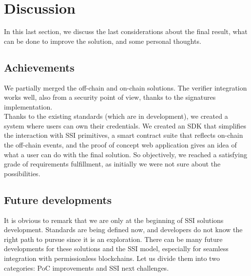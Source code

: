 \section{Discussion}
In this last section, we discuss the last considerations about the final result, what 
can be done to improve the solution, and some personal thoughts.

\subsection{Achievements}
We partially merged the off-chain and on-chain solutions. The verifier integration works well,
also from a security point of view, thanks to the signatures implementation.\\
Thanks to the existing standards (which are in development), we created a system where 
users can own their credentials. We created an SDK that simplifies the interaction with 
SSI primitives, a smart contract suite that reflects on-chain the off-chain events, and 
the proof of concept web application gives an idea of what a user can do with the final 
solution.
So objectively, we reached a satisfying grade of requirements fulfillment, as initially
we were not sure about the possibilities.

\subsection{Future developments}
It is obvious to remark that we are only at the beginning of SSI solutions development. 
Standards are being defined now, and developers do not know the right path to pursue 
since it is an exploration.
There can be many future developments for these solutions and the SSI model, especially
for seamless integration with permissionless blockchains. Let us divide them into two 
categories: PoC improvements and SSI next challenges.
